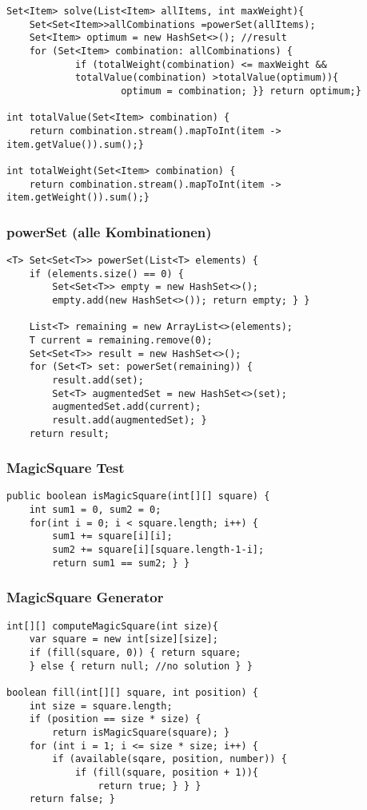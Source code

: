 \begin{multicols*}{5}
\begin{lstlisting}
Set<Item> solve(List<Item> allItems, int maxWeight){ 
	Set<Set<Item>>allCombinations =powerSet(allItems); 
	Set<Item> optimum = new HashSet<>(); //result
	for (Set<Item> combination: allCombinations) {
			if (totalWeight(combination) <= maxWeight && 
			totalValue(combination) >totalValue(optimum)){
					optimum = combination; }} return optimum;}

int totalValue(Set<Item> combination) {
	return combination.stream().mapToInt(item -> item.getValue()).sum();}

int totalWeight(Set<Item> combination) {
	return combination.stream().mapToInt(item -> item.getWeight()).sum();}
		\end{lstlisting}
	\subsubsection{powerSet (alle Kombinationen)}
		\begin{lstlisting}
<T> Set<Set<T>> powerSet(List<T> elements) {
	if (elements.size() == 0) {
		Set<Set<T>> empty = new HashSet<>(); 
		empty.add(new HashSet<>()); return empty; } }

	List<T> remaining = new ArrayList<>(elements);
	T current = remaining.remove(0);
	Set<Set<T>> result = new HashSet<>();
	for (Set<T> set: powerSet(remaining)) {
		result.add(set);
		Set<T> augmentedSet = new HashSet<>(set); 
		augmentedSet.add(current); 
		result.add(augmentedSet); }
	return result;
		\end{lstlisting}
	
	
	\subsubsection{MagicSquare Test}
		\begin{lstlisting}
public boolean isMagicSquare(int[][] square) { 
	int sum1 = 0, sum2 = 0;
    for(int i = 0; i < square.length; i++) { 
		sum1 += square[i][i];
		sum2 += square[i][square.length-1-i];
		return sum1 == sum2; } }
		\end{lstlisting}
	\subsubsection{MagicSquare Generator}
		\begin{lstlisting}
int[][] computeMagicSquare(int size){
	var square = new int[size][size];
	if (fill(square, 0)) { return square;
	} else { return null; //no solution } }

boolean fill(int[][] square, int position) {
	int size = square.length;
	if (position == size * size) {
		return isMagicSquare(square); }
	for (int i = 1; i <= size * size; i++) {
		if (available(sqare, position, number)) {
			if (fill(square, position + 1)){
				return true; } } }
	return false; }


\end{lstlisting}
\end{multicols*}
